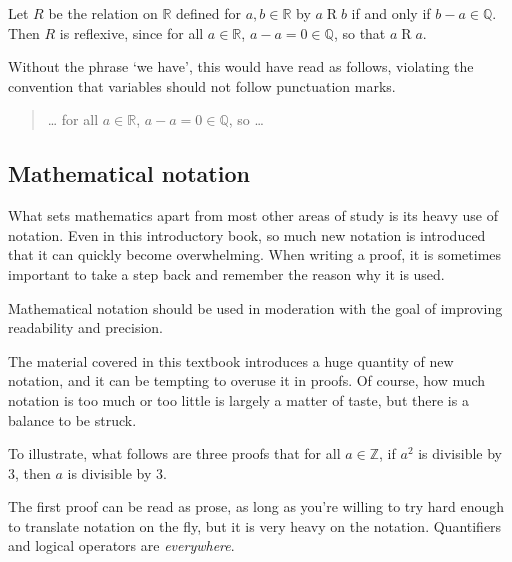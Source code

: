 \begin{extract}
\label{xtrDifferenceOfRealsInQIsReflexive}
Let $R$ be the relation on $\mathbb{R}$ defined for $a,b \in \mathbb{R}$ by $a \mathrel{R} b$ if and only if $b-a \in \mathbb{Q}$. Then $R$ is reflexive, since for all $a \in \mathbb{R}$,  $a-a = 0 \in \mathbb{Q}$, so that $a \mathrel{R} a$.
\end{extract}

Without the phrase `we have', this would have read as follows, violating the convention that variables should not follow punctuation marks.
\begin{quote}
\dots{} for all $a \in \mathbb{R}$, $a-a = 0 \in \mathbb{Q}$, so \dots{}
\end{quote}

\subsection*{Mathematical notation}

What sets mathematics apart from most other areas of study is its heavy use of notation. Even in this introductory book, so much new notation is introduced that it can quickly become overwhelming. When writing a proof, it is sometimes important to take a step back and remember the reason why it is used.

\begin{writingprinciple}
\label{wpPurposeOfNotation}
Mathematical notation should be used in moderation with the goal of improving readability and precision.
\end{writingprinciple}

The material covered in this textbook introduces a huge quantity of new notation, and it can be tempting to overuse it in proofs. Of course, how much notation is too much or too little is largely a matter of taste, but there is a balance to be struck.

To illustrate, what follows are three proofs that for all $a \in \mathbb{Z}$, if $a^2$ is divisible by $3$, then $a$ is divisible by $3$.

The first proof can be read as prose, as long as you're willing to try hard enough to translate notation on the fly, but it is very heavy on the notation. Quantifiers and logical operators are \textit{everywhere}.

